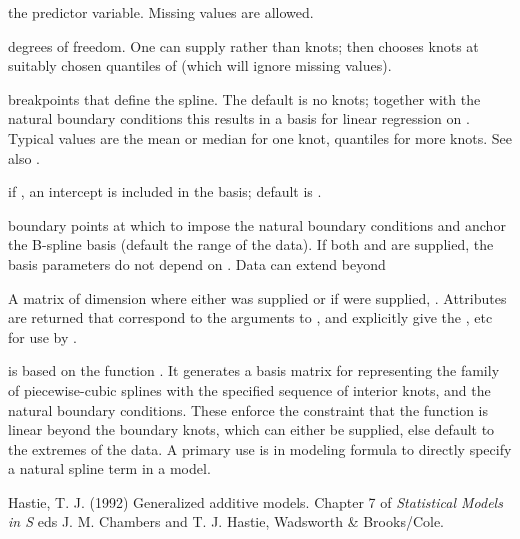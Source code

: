 \begin{Arguments}
\begin{ldescription}
\item[\code{x}] the predictor variable.  Missing values are allowed.
\item[\code{df}] degrees of freedom. One can supply  rather than
knots;  then chooses  knots at
suitably chosen quantiles of  (which will ignore missing values).
\item[\code{knots}] breakpoints that define the spline.  The default is no
knots; together with the natural boundary conditions this results in
a basis for linear regression on .  Typical values are the
mean or median for one knot, quantiles for more knots.  See also
.
\item[\code{intercept}] if , an intercept is included in the
basis; default is .
\item[\code{Boundary.knots}] boundary points at which to impose the natural
boundary conditions and anchor the B-spline basis (default the range
of the data).  If both  and  are
supplied, the basis parameters do not depend on . Data can
extend beyond 
\end{ldescription}
\end{Arguments}
%
\begin{Value}
A matrix of dimension  where either  was
supplied or if  were supplied,
.
Attributes are returned that correspond to the arguments to ,
and explicitly give the ,  etc for
use by .

 is based on the function .  It
generates a basis matrix for representing the family of
piecewise-cubic splines with the specified sequence of
interior knots, and the natural boundary conditions.  These enforce
the constraint that the function is linear beyond the boundary knots,
which can either be supplied, else default to the extremes of the
data.  A primary use is in modeling formula to directly specify a
natural spline term in a model.
\end{Value}
%
\begin{References}\relax
Hastie, T. J. (1992)
Generalized additive models.
Chapter 7 of \emph{Statistical Models in S}
eds J. M. Chambers and T. J. Hastie, Wadsworth \& Brooks/Cole.
\end{References}
